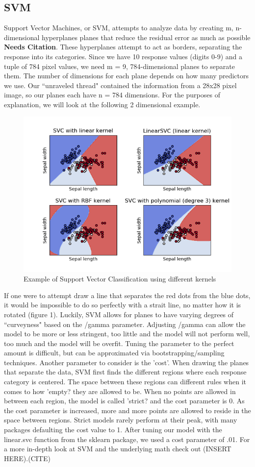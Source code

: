 \documentclass[11pt, oneside]{article}   	%
\begin{document}
\subsection{SVM}
Support Vector Machines, or SVM, attempts to analyze data by creating m, n-dimensional hyperplanes planes that reduce the residual error as much as possible \textbf{Needs Citation}. These hyperplanes attempt to act as borders, separating the response into its categories. Since we have 10 response values (digits 0-9) and a tuple of 784 pixel values, we need m = 9, 784-dimensional planes to separate them. The number of dimensions for each plane depends on how many predictors we use. Our ``unraveled thread" contained the information from a 28x28 pixel image, so our planes each have n = 784 dimensions. For the purposes of explanation, we will look at the following 2 dimensional example.
\begin{figure}
\caption{Example of Support Vector Classification using different kernels}
\includegraphics[width=\textwidth]{Figure_1.png}
\end{figure}
If one were to attempt draw a line that separates the red dots from the blue dots, it would be impossible to do so perfectly with a strait line, no matter how it is rotated (figure 1). Luckily, SVM allows for planes to have varying degrees of ``curveyness" based on the /gamma parameter. Adjusting /gamma can allow the model to be more or less stringent, too little and the model will not perform well, too much and the model will be overfit. Tuning the parameter to the perfect amount is difficult, but can be approximated via bootstrapping/sampling techniques. Another parameter to consider is the 'cost'. When drawing the planes that separate the data, SVM first finds the different regions where each response category is centered. The space between these regions can different rules when it comes to how 'empty? they are allowed to be. When no points are allowed in between each region, the model is called 'strict?  and the cost parameter is 0. As the cost parameter is increased, more and more points are allowed to reside in the space between regions. Strict models rarely perform at their peak, with many packages defaulting the cost value to 1. After tuning our model with the linear.svc function from the sklearn package, we used a cost parameter of .01. For a more in-depth look at SVM and the underlying math check out (INSERT HERE).(CITE)
\end{document}
